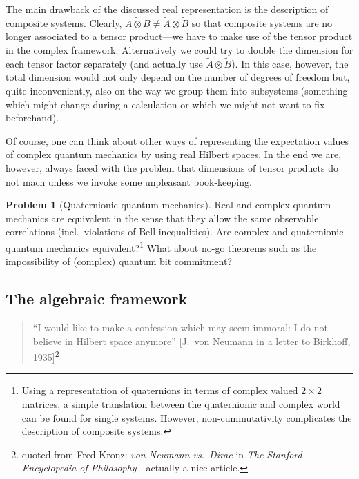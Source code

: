 \documentclass[11pt,a4paper]{article}
\theoremstyle{plain}
\theoremstyle{definition}
\newtheorem{problem}{Problem}
\theoremstyle{remark}
\numberwithin{equation}{section}
\begin{document}
The main drawback of the discussed real representation is the description of composite systems. Clearly, $\widetilde{A\otimes B}\ne \tilde{A}\otimes \tilde{B}$ so that composite systems are no longer associated to a tensor product---we have to make use of the tensor product in the complex framework. Alternatively we could try to double the dimension for each tensor factor separately (and actually use $\tilde{A}\otimes \tilde{B}$). In this case, however, the total dimension would not only depend on the number of degrees of freedom but, quite inconveniently, also on the way we group them into subsystems (something which might change during a calculation or which we might not want to fix beforehand).

Of course, one can think about other ways of representing the expectation values of complex quantum mechanics by using real Hilbert spaces. In the end we are, however, always faced with the problem that dimensions of tensor products do not mach unless we invoke some unpleasant book-keeping.

\begin{problem}[Quaternionic quantum mechanics]
Real and complex quantum mechanics are equivalent in the sense that they allow the same observable correlations (incl.\ violations of Bell inequalities). Are complex and quaternionic quantum mechanics equivalent?\footnote{Using a representation of quaternions in terms of complex valued $2\times 2$ matrices, a simple translation between the quaternionic and complex world can be found for single systems. However, non-cummutativity complicates the description of composite systems.} What about no-go theorems such as the impossibility of (complex) quantum bit commitment?
\end{problem}

\subsection{The algebraic framework}

\begin{quote}
    ``I would like to make a confession which may seem immoral: I do not believe in Hilbert space anymore'' [J.\ von Neumann in a letter to Birkhoff, 1935]\footnote{quoted from Fred Kronz: \emph{von Neumann vs.\ Dirac} in \emph{The Stanford Encyclopedia of Philosophy}---actually a nice article.}
\end{quote}
\end{document}

